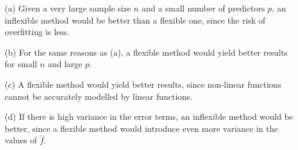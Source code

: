 
\begin{itemize}
    \item[(a)] Given a very large sample size $n$ and a small number of predictors 
    $p$, an inflexible method would be better than a flexible one, since the risk of
    overfitting is less.
    \item[(b)] For the same reasons as (a), a flexible method would yield better 
    results for small $n$ and large $p$.
    \item[(c)] A flexible method would yield better results, since non-linear
    functions cannot be accurately modelled by linear functions.
    \item[(d)] If there is high variance in the error terms, an inflexible method
    would be better, since a flexible method would introduce even more variance
    in the values of $\hat{f}$.
\end{itemize}

